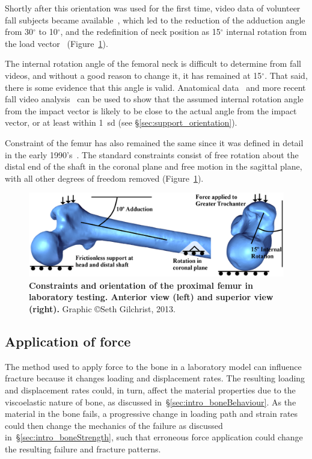 Shortly after this orientation was used for the first time, video data of volunteer fall subjects became available~\citep{van_den_kroonenberg_hip_1996}, which led to the reduction of the adduction angle from 30$^\circ$ to 10$^\circ$, and the redefinition of neck position as 15$^\circ$ internal rotation from the load vector~\citep{courtney_effects_1994} (Figure~\ref{fig:constraint_orient}).

The internal rotation angle of the femoral neck is difficult to determine from fall videos, and without a good reason to change it, it has remained at 15$^\circ$.
That said, there is some evidence that this angle is valid.
Anatomical data~\citep{toogood_proximal_2009} and more recent fall video analysis~\citep{feldman_reducing_2007} can be used to show that the assumed internal rotation angle from the impact vector is likely to be close to the actual angle from the impact vector, or at least within 1~\acl{sd} (see \S\ref{sec:support_orientation}).

Constraint of the femur has also remained the same since it was defined in detail in the early 1990's~\citep{lotz_use_1990, courtney_effects_1994}.
The standard constraints consist of free rotation about the distal end of the shaft in the coronal plane and free motion in the sagittal plane, with all other degrees of freedom removed (Figure~\ref{fig:constraint_orient}).

\begin{figure}
	\centering
	\includegraphics[width=1\linewidth]{./intro/Figures/FEM_Constraints}
	\caption[Proximal femur loading and orientation constraints]{\textbf{Constraints and orientation of the proximal femur in laboratory testing. Anterior view (left) and superior view (right).} Graphic \copyright Seth Gilchrist, 2013.}
	\label{fig:constraint_orient}
\end{figure}
	
\subsection{Application of force}
\label{sec:intro_understanding_modelling_lab_force}
The method used to apply force to the bone in a laboratory model can influence fracture because it changes loading and displacement rates.
The resulting loading and displacement rates could, in turn, affect the material properties due to the viscoelastic nature of bone, as discussed in~\S\ref{sec:intro_boneBehaviour}.
As the material in the bone fails, a progressive change in loading path and strain rates could then change the mechanics of the failure as discussed in~\S\ref{sec:intro_boneStrength}, such that erroneous force application could change the resulting failure and fracture patterns.

